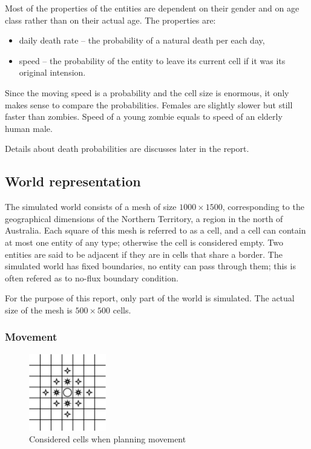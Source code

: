 \documentclass[a4paper]{article}
\begin{document}
Most of the properties of the entities are dependent on their gender and on age class rather than on their actual age.
The properties are:
\begin{itemize}
\item daily death rate -- the probability of a natural death per each day,
\item speed -- the probability of the entity to leave its current cell if it was its original intension.
\end{itemize}

Since the moving speed is a probability and the cell size is enormous, it only makes sense to compare the probabilities.
Females are slightly slower but still faster than zombies.
Speed of a young zombie equals to speed of an elderly human male.

Details about death probabilities are discusses later in the report.

\subsection{World representation}

The simulated world consists of a mesh of size $1000 \times 1500$, corresponding to the geographical dimensions of the Northern Territory, a region in the north of Australia\cite{northernterritory}.
Each square of this mesh is referred to as a cell, and a cell can contain at most one entity of any type; otherwise the cell is considered empty.
Two entities are said to be adjacent if they are in cells that share a border.
The simulated world has fixed boundaries, no entity can pass through them; this is often refered as to no-flux boundary condition.

For the purpose of this report, only part of the world is simulated.
The actual size of the mesh is $500 \times 500$ cells.

\subsubsection{Movement}

\begin{figure}[ht]
    \centering
    \includegraphics[width=0.3\textwidth]{movement}
    \caption{Considered cells when planning movement}
\end{figure}
\end{document}
